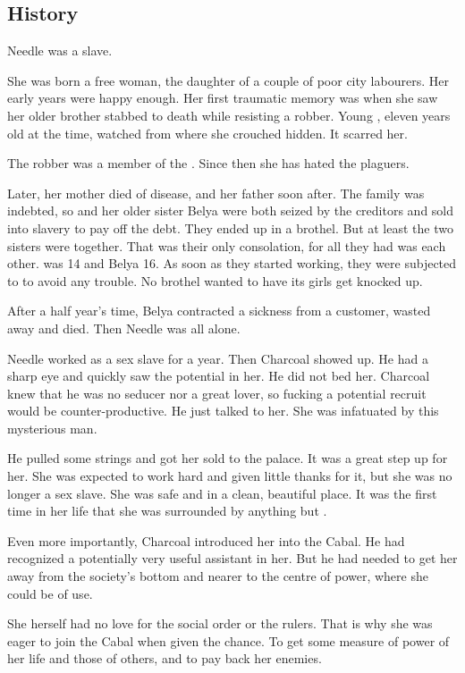 \subsection{History}
Needle was a slave. 

She was born a free woman, the daughter of a couple of poor city labourers. 
Her early years were happy enough. 
Her first traumatic memory was when she saw her older brother stabbed to death while resisting a robber. 
Young \Piacet, eleven years old at the time, watched from where she crouched hidden. 
It scarred her. 

The robber was a member of the . 
Since then she has hated the plaguers. 

Later, her mother died of disease, and her father soon after. 
The family was indebted, so \Piacet{} and her older sister Belya were both seized by the creditors and sold into slavery to pay off the debt. 
They ended up in a brothel. 
But at least the two sisters were together. 
That was their only consolation, for all they had was each other. 
\Piacet{} was 14 and Belya 16. 
As soon as they started working, they were subjected to  to avoid any trouble. 
No brothel wanted to have its girls get knocked up. 

After a half year's time, Belya contracted a sickness from a customer, wasted away and died. 
Then Needle was all alone. 

Needle worked as a sex slave for a year. 
Then Charcoal showed up. 
He had a sharp eye and quickly saw the potential in her. 
He did not bed her. 
Charcoal knew that he was no seducer nor a great lover, so fucking a potential recruit would be counter-productive. 
He just talked to her. 
She was infatuated by this mysterious man. 

He pulled some strings and got her sold to the palace. 
It was a great step up for her. 
She was expected to work hard and given little thanks for it, but she was no longer a sex slave. 
She was safe and in a clean, beautiful place. 
It was the first time in her life that she was surrounded by anything but \squalour. 

Even more importantly, Charcoal introduced her into the Cabal. 
He had recognized a potentially very useful assistant in her. 
But he had needed to get her away from the society's bottom and nearer to the centre of power, where she could be of use. 

She herself had no love for the social order or the rulers. 
That is why she was eager to join the Cabal when given the chance. 
To get some measure of power of her life and those of others, and to pay back her enemies. 

